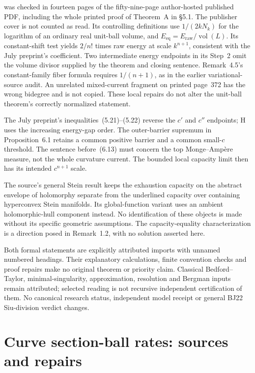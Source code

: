 \cite{BB10} was checked in fourteen pages of the fifty-nine-page
author-hosted published PDF, including the whole printed proof
of Theorem~A in \S5.1. The publisher cover is not counted as
read. Its controlling definitions use $1/(2kN_k)$ for the
logarithm of an ordinary real unit-ball volume, and
$E_{\mathrm{eq}}=E_{\mathrm{raw}}/\operatorname{vol}(L)$.
Its constant-shift test yields $2/n!$ times raw energy at
scale $k^{n+1}$, consistent with the July preprint's coefficient.
Two intermediate energy endpoints in its Step~2 omit the
volume divisor supplied by the theorem and closing sentence.
Remark~4.5's constant-family fiber formula requires $1/(n+1)$,
as in the earlier variational-source audit. An unrelated
mixed-current fragment on printed page~372 has the wrong
bidegree and is not copied. These local repairs do not alter
the unit-ball theorem's correctly normalized statement.

The July preprint's inequalities~(5.21)--(5.22) reverse the
$c'$ and $c''$ endpoints; H uses the increasing energy-gap
order. The outer-barrier supremum in Proposition~6.1 retains
a common positive barrier and a common small-$c$ threshold.
The sentence before~(6.13) must concern the top Monge--Amp\`ere
measure, not the whole curvature current. The bounded local
capacity limit then has its intended $c^{n+1}$ scale.

The source's general Stein result keeps the exhaustion capacity
on the abstract envelope of holomorphy separate from the
underlined capacity over containing hyperconvex Stein manifolds.
Its global-function variant uses an ambient holomorphic-hull
component instead. No identification of these objects is made
without its specific geometric assumptions. The capacity-equality
characterization is a direction posed in Remark~1.2, with no
solution asserted here.

Both formal statements are explicitly attributed imports with
unnamed numbered headings. Their explanatory calculations,
finite convention checks and proof repairs make no original
theorem or priority claim. Classical Bedford--Taylor,
minimal-singularity, approximation, resolution and Bergman
inputs remain attributed; selected reading is not recursive
independent certification of them. No canonical research status,
independent model receipt or general BJ22 Siu-division verdict
changes.

\section{Curve section-ball rates: sources and repairs}
\label{sec:appL-section-ball-rates-sources}


